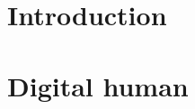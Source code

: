 


\graphicspath{
{images/summer_school_study/png/}
{images/summer_school_study/}
{images/summer_school_study/plots/}
{images/summer_school_study/2018/}
{images/fiber_creation/}
}



\tableofcontents


\part{Introduction}
%  
\part{Digital human}

%

